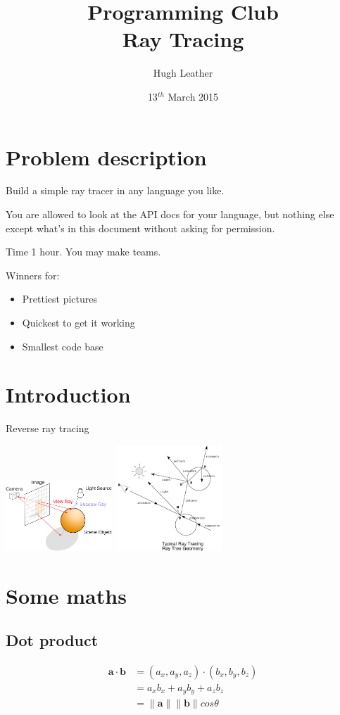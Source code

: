 \documentclass{article}
\title{
    \textbf{Programming Club}\\
    Ray Tracing
}
\author{Hugh Leather}
\date{13$^{th}$ March 2015}
\begin{document}
    \maketitle
    
    \section{Problem description}
        Build a simple ray tracer in any language you like.
        
        You are allowed to look at the API docs for your language, but nothing else except what's in this document without asking for 
        permission.
        
        Time 1 hour. You may make teams.
        
        Winners for:
        \begin{itemize}
            \item Prettiest pictures
            \item Quickest to get it working
            \item Smallest code base
        \end{itemize}
            
    \section{Introduction}
        Reverse ray tracing 
        
        \includegraphics[width=0.3\textwidth]{tracing}
        \includegraphics[width=0.3\textwidth]{tree}
    
    \section{Some maths}
        \subsection{Dot product}
            \begin{align*}
                \mathbf{a} \cdot \mathbf{b} &= (a_x,a_y,a_z) \cdot (b_x,b_y,b_z)\\
                                            &= a_xb_x + a_yb_y + a_zb_z\\
                                            &= \lVert\mathbf{a}\rVert \lVert\mathbf{b}\rVert cos \theta
            \end{align*}
\end{document}
